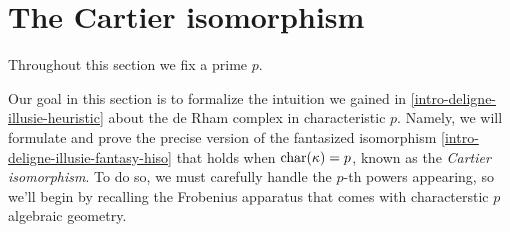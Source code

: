 
\section{The Cartier isomorphism}
\label{cartier}

\begin{notation}
  \label{cartier-char}
  Throughout this section we fix a prime $p$.
\end{notation}

Our goal in this section is to formalize the intuition we gained in \cref{intro-deligne-illusie-heuristic} about the de Rham complex in characteristic $p$. Namely, we will formulate and prove the precise version of the fantasized isomorphism \cref{intro-deligne-illusie-fantasy-hiso} that holds when $\operatorname{char}(\kappa) = p$, known as the \emph{Cartier isomorphism}. To do so, we must carefully handle the $p$-th powers appearing, so we'll begin by recalling the Frobenius apparatus that comes with characterstic $p$ algebraic geometry.

